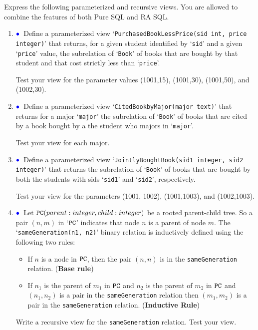\documentclass[11pt]{article}
\newcommand{\blue}[1]{{\color{blue}#1}}
\newcommand{\bluebullet}{$\blue{\bullet}$}
\begin{document}
Express the following parameterized and recursive views. You are allowed to combine the features of both Pure SQL and RA SQL.

\begin{enumerate}[resume]

           
\item\label{viewone} \bluebullet\  Define a parameterized view `{\tt PurchasedBookLessPrice(sid int, price integer)}' that returns, for a given student
identified by `{\tt sid}' and a given `{\tt price}' value, the subrelation of
`{\tt Book}' of books that are bought by that student and that cost strictly less than `{\tt price}'.

Test your view for the parameter values (1001,15), (1001,30), (1001,50), and (1002,30).

\item \bluebullet\ Define a parameterized view `{\tt CitedBookbyMajor(major text)}' that returns for a major `{\tt major}'
the subrelation of `{\tt Book}' of books that are cited by a book bought by a the student who majors in `{\tt major}'.

Test your view for each major.

\item \bluebullet\ Define a parameterized view `{\tt JointlyBoughtBook(sid1 integer, sid2 integer)}' that returns the subrelation of `{\tt Book}' of books
that are bought by both the students with sids `{\tt sid1}' and `{\tt sid2}', respectively.

Test your view for the parameters (1001, 1002), (1001,1003), and (1002,1003).


\item \bluebullet\  Let ${\tt PC}(parent: integer, child: integer)$ be a rooted parent-child tree.   So a pair $(n,m)$ in `${\tt PC}$' indicates that node $n$ is a parent of node $m$.
The `{\tt sameGeneration(n1, n2)}' binary relation is inductively defined using the following two rules:
\begin{itemize}
\item If $n$ is a node in ${\tt PC}$, then the pair $(n,n)$ is in the {\tt sameGeneration} relation. ({\bf Base rule})
\item If $n_1$ is the parent of $m_1$ in ${\tt PC}$ and $n_2$ is the parent of $m_2$ in ${\tt PC}$ and 
$(n_1,n_2)$ is a pair in the {\tt sameGeneration} relation then $(m_1,m_2)$ is a pair in the {\tt sameGeneration} relation. ({\bf Inductive Rule})
\end{itemize}

Write a \blue{recursive view} for the {\tt sameGeneration} relation.
Test your view.

\end{enumerate}
\end{document}
